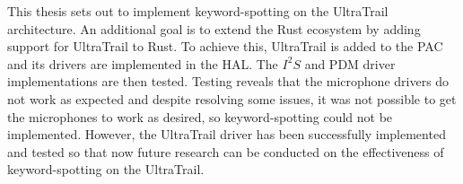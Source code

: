 
This thesis sets out to implement keyword-spotting on the UltraTrail architecture.
An additional goal is to extend the Rust ecosystem by adding support for UltraTrail to Rust.
To achieve this, UltraTrail is added to the PAC and its drivers are implemented in the HAL.
The $I^2S$ and PDM driver implementations are then tested.
Testing reveals that the microphone drivers do not work as expected and despite
resolving some issues, it was not possible to get the microphones to work as desired,
so keyword-spotting could not be implemented.
However, the UltraTrail driver has been successfully implemented and tested so that
now future research can be conducted on the effectiveness of keyword-spotting on the UltraTrail.
